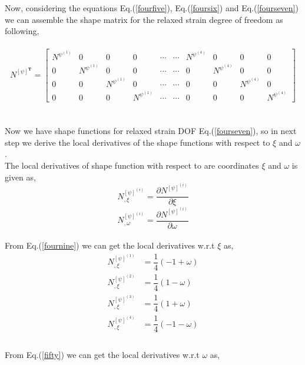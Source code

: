 \documentclass[12pt]{article}
\begin{document}
\\
\\
Now, considering the equations Eq.(\ref{fourfive}), Eq.(\ref{foursix}) and Eq.(\ref{fourseven}) we can assemble the shape matrix for the relaxed strain degree of freedom as following,
\\
\\
\begin{equation}\label{foureight}
N^{[\psi]^\textbf{T}}=
\begin{bmatrix}
N^{{\psi}^{(1)}}&0&0&0&\cdots&\cdots&N^{{\psi}^{(4)}}&0&0&0 \\
0&N^{{\psi}^{(1)}}&0&0&\cdots&\cdots&0&N^{{\psi}^{(4)}}&0&0 \\
0&0&N^{{\psi}^{(1)}}&0&\cdots&\cdots&0&0&N^{{\psi}^{(4)}}&0 \\
0&0&0&N^{{\psi}^{(1)}}&\cdots&\cdots&0&0&0&N^{{\psi}^{(4)}} 
\end{bmatrix}
\end{equation}
\\
\\
Now we have shape functions for relaxed strain DOF Eq.(\ref{fourseven}), so in next step we derive the local derivatives of the shape functions with respect to $\xi$ and $\omega$. 
\\
The local derivatives of shape function with respect to are coordinates $\xi$ and $\omega$ is given as, 
\begin{equation}\label{fournine}
N^{[\psi]^{(i)}}_{,\xi} = \dfrac{\partial N^{[\psi]^{(i)}} }{\partial \xi}
\end{equation}
\begin{equation}\label{fifty}
N^{[\psi]^{(i)}}_{,\omega} = \dfrac{\partial N^{[\psi]^{(i)}} }{\partial \omega}
\end{equation}
\\
From Eq.(\ref{fournine}) we can get the local derivatives w.r.t  $\xi$ as,
\begin{equation}
\begin{aligned}
N_{,\xi}^{[\psi]^{(1)}} &= \dfrac{1}{4}(-1+\omega) \\
N_{,\xi}^{[\psi]^{(2)}} &= \dfrac{1}{4}(1-\omega) \\
N_{,\xi}^{[\psi]^{(3)}} &= \dfrac{1}{4}(1+\omega) \\
N_{,\xi}^{[\psi]^{(4)}} &= \dfrac{1}{4}(-1-\omega) \\
\end{aligned}
\end{equation}
\\
From Eq.(\ref{fifty}) we can get the local derivatives w.r.t  $\omega$ as,
\end{document}
